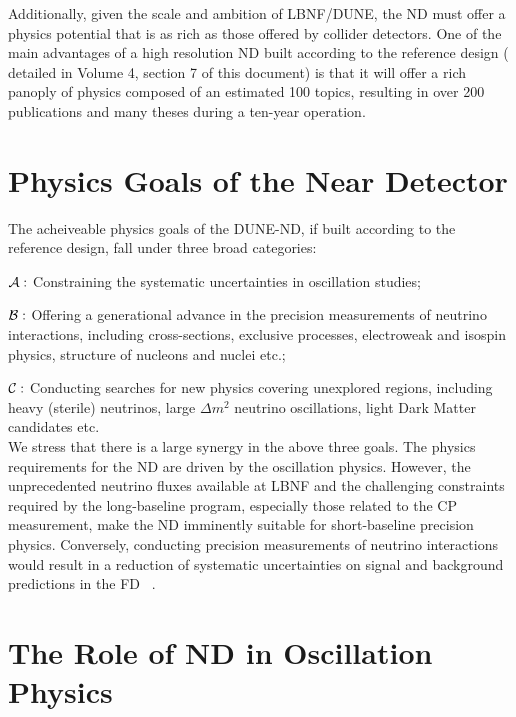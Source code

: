 Additionally, given the scale and ambition of LBNF/DUNE, the ND must offer a physics 
potential that is as rich as those offered by collider detectors. One of the main advantages 
of a high resolution ND built according to the reference design ( detailed in Volume 4, section 7 of  this document) is that it will offer a rich panoply of physics composed 
of an estimated 100 topics,  resulting in over 200 publications and many theses during 
a ten-year operation. 


\section{Physics Goals of the Near Detector}
\label{sec:physics-nd-goals}

The acheiveable physics goals of the DUNE-ND, if built according to the reference design,  fall under three broad categories: 

\noindent
{\boldmath $ {\cal A:}$} Constraining the systematic uncertainties in  oscillation studies;  

\noindent
{\boldmath $ {\cal B:}$} Offering a generational advance in the precision measurements of neutrino interactions, including 
cross-sections, exclusive processes, electroweak and isospin physics, structure of nucleons and nuclei etc.;  

\noindent
{\boldmath $ {\cal C:}$} Conducting searches for new physics covering unexplored regions, 
including heavy (sterile) neutrinos, large $\Delta m^2$ neutrino oscillations, light Dark Matter 
candidates etc. \\
\noindent
We stress that there is a large synergy in the above three goals. The physics requirements for the ND are driven 
by the oscillation physics. However,  the unprecedented neutrino fluxes available at LBNF and the challenging 
constraints required by the long-baseline program, especially those related to the CP measurement,   make the ND imminently suitable for  short-baseline 
precision physics. Conversely, conducting precision measurements of neutrino 
interactions would result in a reduction of systematic uncertainties on signal and background 
predictions in the FD ~\cite{DPR, LBNE-SCI}. 



\section{The Role of ND in Oscillation Physics}  
\label{sec-nd-oscl} 

